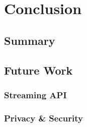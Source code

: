 
\chapter{Conclusion}\label{chapter:conclusion}

\section{Summary}
\section{Future Work}
\subsection{Streaming API}
\subsection{Privacy \& Security}
